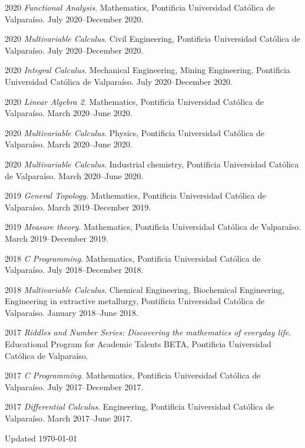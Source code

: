 \documentclass[12pt,letterpaper]{report}
\begin{document}
    \begin{tablist}

        \item[2020] \tab \emph{Functional Analysis}. Mathematics, Pontificia Universidad Cat\'olica de Valpara\'iso. July 2020--December 2020.
            
        \item[2020] \tab \emph{Multivariable Calculus}. Civil Engineering, Pontificia Universidad Cat\'olica de Valpara\'iso. July 2020--December 2020.
            
        \item[2020] \tab \emph{Integral Calculus}. Mechanical Engineering, Mining Engineering, Pontificia Universidad Cat\'olica de Valpara\'iso. July 2020--December 2020.
            
        \item[2020] \tab \emph{Linear Algebra 2}. Mathematics, Pontificia Universidad Cat\'olica de Valpara\'iso. March 2020--June 2020.
            
        \item[2020] \tab \emph{Multivariable Calculus}. Physics, Pontificia Universidad Cat\'olica de Valpara\'iso. March 2020--June 2020.
            
        \item[2020] \tab \emph{Multivariable Calculus}. Industrial chemistry, Pontificia Universidad Cat\'olica de Valpara\'iso. March 2020--June 2020.
        
        \item[2019] \tab \emph{General Topology}. Mathematics, Pontificia Universidad Cat\'olica de Valpara\'iso. March 2019--December 2019.
            
        \item[2019] \tab \emph{Measure theory}. Mathematics, Pontificia Universidad Cat\'olica de Valpara\'iso. March 2019--December 2019.
            
        \item[2018] \tab \emph{C Programming}. Mathematics, Pontificia Universidad Cat\'olica de Valpara\'iso. July 2018--December 2018.
            
        \item[2018] \tab \emph{Multivariable Calculus}. Chemical Engineering, Biochemical Engineering, Engineering in extractive metallurgy, Pontificia Universidad Cat\'olica de Valpara\'iso. January 2018--June 2018.
         
        \item[2017] \tab \emph{Riddles and Number Series: Discovering the mathematics of everyday life}. Educational Program for Academic Talents BETA, Pontificia Universidad Cat\'olica de Valpara\'iso.

        \item[2017] \tab \emph{C Programming}. Mathematics, Pontificia Universidad Cat\'olica de Valpara\'iso. July 2017--December 2017.
            
        \item[2017] \tab \emph{Differential Calculus}. Engineering, Pontificia Universidad Cat\'olica de Valpara\'iso. March 2017--June 2017.

    \end{tablist}
    \begin{center}
        \vfill
        Updated \monthyeardate\today
    \end{center}
\end{document}
